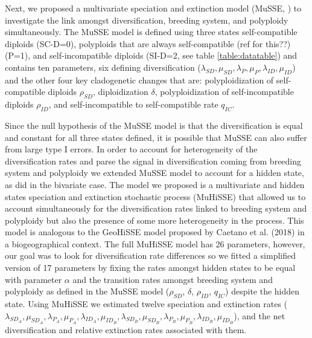 Next, we proposed a multivariate speciation and extinction model (MuSSE, \citet{fitzjohn_2012}) to investigate the link amongst diversification, breeding system, and polyploidy simultaneously. The MuSSE model is defined using three states self-compatible diploids (SC-D=0), polyploids that are always self-compatible (ref for this??) (P=1), and self-incompatible diploids (SI-D=2, see table \cref{table:datatable}) and contains ten parameters, six defining diversification ($\lambda_{SD}, \mu_{SD},\lambda_{P},\mu_{P}, \lambda_{ID},\mu_{ID}$) and the other four key cladogenetic changes that are: polyploidization of self-compatible diploids $\rho_{SD}$, diploidization $\delta$, polyploidization of self-incompatible diploids $\rho_{ID}$, and self-incompatible to self-compatible rate $q_{IC}$.\newline

Since the null hypothesis of the MuSSE model is that the diversification is equal and constant for all three states defined, it is possible that MuSSE can also suffer from large type I errors. In order to account for heterogeneity of the diversification rates and parse the signal in diversification coming from breeding system and polyploidy we extended MuSSE model to account for a hidden state, as \citet{beaulieu_2016} did in the bivariate case. The model we proposed is a multivariate and hidden states speciation and extinction stochastic process (MuHiSSE) that allowed us to account simultaneously for the diversification rates linked to breeding system and polyploidy but also the presence of some more heterogeneity in the process.  This model is analogous to the GeoHiSSE model proposed by Caetano et al. (2018) in a biogeographical context. The full MuHiSSE model has 26 parameters, however, our goal was to look for diversification rate differences so we fitted a simplified version of 17 parameters by fixing the rates amongst hidden states to be equal with parameter $\alpha$ and the transition rates amongst breeding system and polyploidy as defined in the MuSSE model  ($\rho_{SD}$,  $\delta$,  $\rho_{ID}$,  $q_{IC}$) despite the hidden state. Using MuHiSSE we estimated twelve speciation and extinction rates ($\lambda_{SD_A}, \mu_{SD_A},\lambda_{P_A},\mu_{P_A}, \lambda_{ID_A},\mu_{ID_B},\lambda_{SD_B}, \mu_{SD_B},\lambda_{P_B},\mu_{P_B}, \lambda_{ID_B},\mu_{ID_B}$), and the net diversification and relative extinction rates associated with them.\newline

